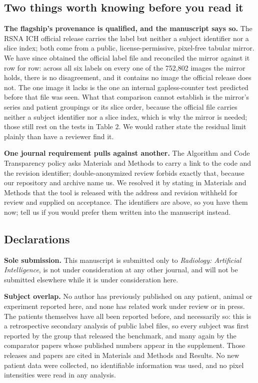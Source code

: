 \documentclass[11pt,letterpaper]{article}
\begin{document}
\subsection*{Two things worth knowing before you read it}

\textbf{The flagship's provenance is qualified, and the manuscript says so.} The
RSNA ICH official release carries the label but neither a subject identifier nor
a slice index; both come from a public, license-permissive, pixel-free tabular
mirror. We have since obtained the official label file and reconciled the mirror
against it row for row: across all six labels on every one of the 752,802
images the mirror holds, there is no disagreement, and it contains no image the
official release does not. The one image it lacks is the one an internal
gapless-counter test predicted before that file was seen. What that comparison
cannot establish is the mirror's series and patient groupings or its slice order,
because the official file carries neither a subject identifier nor a slice index,
which is why the mirror is needed; those still rest on the tests in Table 2. We
would rather state the residual limit plainly than have a reviewer find it.

\textbf{One journal requirement pulls against another.} The Algorithm and Code
Transparency policy asks Materials and Methods to carry a link to the code and
the revision identifier; double-anonymized review forbids exactly that, because
our repository and archive name us. We resolved it by stating in Materials and
Methods that the tool is released with the address and revision withheld for
review and supplied on acceptance. The identifiers are above, so you have them
now; tell us if you would prefer them written into the manuscript instead.

\subsection*{Declarations}

\textbf{Sole submission.} This manuscript is submitted only to \emph{Radiology:
Artificial Intelligence}, is not under consideration at any other journal, and
will not be submitted elsewhere while it is under consideration here.

\textbf{Subject overlap.} No author has previously published on any patient,
animal or experiment reported here, and none has related work under review or in
press. The patients themselves have all been reported before, and necessarily so:
this is a retrospective secondary analysis of public label files, so every
subject was first reported by the group that released the benchmark, and many
again by the comparator papers whose published numbers appear in the supplement.
Those releases and papers are cited in Materials and Methods and Results. No new
patient data were collected, no identifiable information was used, and no pixel
intensities were read in any analysis.
\end{document}
